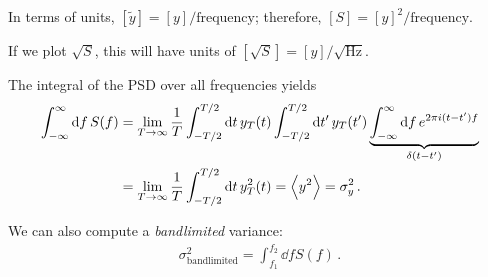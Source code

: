 \documentclass[main.tex]{subfiles}
\begin{document}
In terms of units, \([\widetilde{y}] = [y] / \text{frequency}\); therefore, \([S] = [y]^2 / \text{frequency}\). 

If we plot \(\sqrt{S}\), this will have units of \([\sqrt{S}] = [y] / \sqrt{\text{Hz}}\). 

The integral of the PSD over all frequencies yields 
%
\begin{align}
\int_{- \infty }^{\infty } \dd{f} S(f) 
&= \lim_{T \to \infty } 
\frac{1}{T}
\int_{- T/2}^{T/2} \dd{t} y_T(t) 
\int_{- T/2}^{T/2} \dd{t'} y_T(t') 
\underbrace{\int_{- \infty }^{\infty } \dd{f} e^{2 \pi i (t - t') f}}_{ \delta (t - t')}  \\
&= \lim_{T \to \infty }
\frac{1}{T}
\int_{- T/2}^{T/2} \dd{t} y_T^2(t) = \expval{y^2} = \sigma^2_y 
\,.
\end{align}

We can also compute a \emph{bandlimited} variance: 
%
\begin{align}
\sigma^2 _{\text{bandlimited}} = \int_{f_1 }^{f_2 } \dd{f} S (f)
\,.
\end{align}
\end{document}
